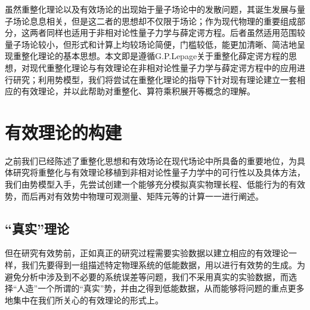 \documentclass[cs4size,titlepage,twoside]{ctexart}
\begin{document}
%

虽然重整化理论以及有效场论的出现始于量子场论中的发散问题，其诞生发展与量子场论息息相关，但是这二者的思想却不仅限于场论；作为现代物理的重要组成部分，这两者同样也适用于非相对论性量子力学与薛定谔方程\cite{Lepage,Hill:2000yj}。后者虽然适用范围较量子场论较小，但形式和计算上均较场论简便，门槛较低，能更加清晰、简洁地呈现重整化理论的基本思想。本文即是遵循G.P.Lepage关于重整化薛定谔方程的思想，对现代重整化理论与有效理论在非相对论性量子力学与薛定谔方程中的应用进行研究；利用势模型，我们将尝试在重整化理论的指导下针对现有理论建立一套相应的有效理论，并以此帮助对重整化、算符乘积展开等概念的理解。
\cleardoublepage
\section{有效理论的构建}

之前我们已经陈述了重整化思想和有效场论在现代场论中所具备的重要地位，为具体研究将重整化与有效理论移植到非相对论性量子力学中的可行性以及具体方法，我们由势模型入手，先尝试创建一个能够充分模拟真实物理长程、低能行为的有效势，而后再对有效势中物理可观测量、矩阵元等的计算一一进行阐述。
\subsection{“真实”理论}
但在研究有效势前，正如真正的研究过程需要实验数据以建立相应的有效理论一样，我们先要得到一组描述特定物理系统的低能数据，用以进行有效势的生成。为避免分析中涉及到不必要的系统误差等问题，我们不采用真实的实验数据，而选择“人造”一个所谓的“真实”势，并由之得到低能数据，从而能够将问题的重点更多地集中在我们所关心的有效理论的形式上。
\end{document}
